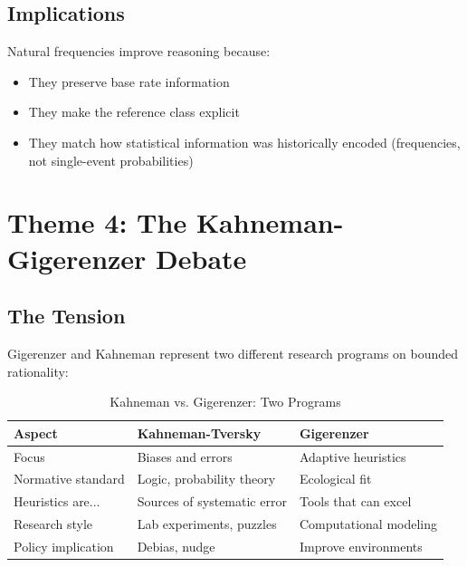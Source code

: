 \subsection{Implications}

Natural frequencies improve reasoning because:
\begin{itemize}[nosep]
\item They preserve base rate information
\item They make the reference class explicit
\item They match how statistical information was historically encoded (frequencies, not single-event probabilities)
\end{itemize}


\section{Theme 4: The Kahneman-Gigerenzer Debate}
\label{sec:gi-debate}

\subsection{The Tension}

Gigerenzer and Kahneman represent two different research programs on bounded rationality:

\begin{table}[htbp]
\centering
\caption{Kahneman vs. Gigerenzer: Two Programs}
\label{tab:gi-kt-debate}
\renewcommand{\arraystretch}{1.3}
\begin{tabular}{@{}lll@{}}
\toprule
\textbf{Aspect} & \textbf{Kahneman-Tversky} & \textbf{Gigerenzer} \\
\midrule
Focus & Biases and errors & Adaptive heuristics \\
Normative standard & Logic, probability theory & Ecological fit \\
Heuristics are... & Sources of systematic error & Tools that can excel \\
Research style & Lab experiments, puzzles & Computational modeling \\
Policy implication & Debias, nudge & Improve environments \\
\bottomrule
\end{tabular}
\end{table}

